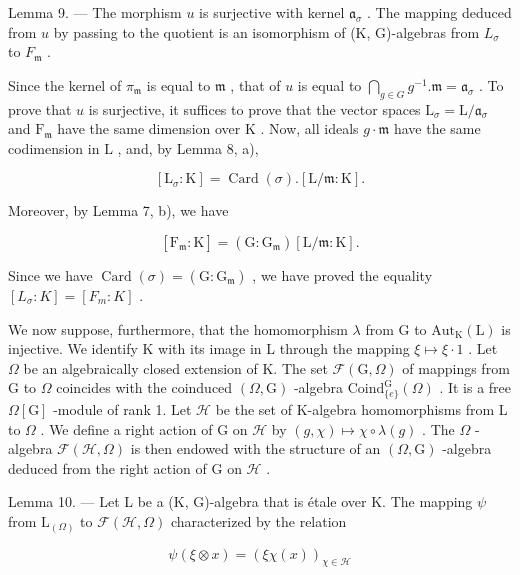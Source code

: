 Lemma 9. --- The morphism \(u\) is surjective with kernel \(\mathfrak{a}_{\sigma}\) . The mapping deduced from \(u\) by passing to the quotient is an isomorphism of (K, G)-algebras from \(L_{\sigma}\) to \(F_{\mathfrak{m}}\) .

Since the kernel of \(\pi_{\mathfrak{m}}\) is equal to \(\mathfrak{m}\) , that of \(u\) is equal to \(\bigcap_{g\in G}g^{-1}.\mathfrak{m} = \mathfrak{a}_{\sigma}\) . To prove that \(u\) is surjective, it suffices to prove that the vector spaces \(\mathrm{L}_{\sigma} = \mathrm{L} / \mathfrak{a}_{\sigma}\) and \(\mathrm{F}_{\mathfrak{m}}\) have the same dimension over \(\mathrm{K}\) . Now, all ideals \(g\cdot \mathfrak{m}\) have the same codimension in \(\mathrm{L}\) , and, by Lemma 8, a),

\[
[ \mathrm{L} _ {\sigma}: \mathrm{K} ] = \operatorname{Card} (\sigma). [ \mathrm{L} / \mathfrak {m}: \mathrm{K} ].
\]

Moreover, by Lemma 7, b), we have

\[
[ \mathrm{F} _ {\mathfrak {m}}: \mathrm{K} ] = (\mathrm{G}: \mathrm{G} _ {\mathfrak {m}}) [ \mathrm{L} / \mathfrak {m}: \mathrm{K} ].
\]

Since we have \(\operatorname{Card}(\sigma)=(\mathrm{G}:\mathrm{G}_{\mathfrak{m}})\) , we have proved the equality \([L_{\sigma}:K]=[F_{m}:K]\) .

We now suppose, furthermore, that the homomorphism \(\lambda\) from G to \(\mathrm{Aut}_{\mathrm{K}}(\mathrm{L})\) is injective. We identify K with its image in L through the mapping \(\xi \mapsto \xi \cdot 1\) . Let \(\Omega\) be an algebraically closed extension of K. The set \(\mathcal{F}(\mathrm{G},\Omega)\) of mappings from G to \(\Omega\) coincides with the coinduced \((\Omega ,\mathrm{G})\) -algebra \(\mathrm{Coind}_{\{e\}}^{\mathrm{G}}(\Omega)\) . It is a free \(\Omega [\mathrm{G}]\) -module of rank 1. Let \(\mathcal{H}\) be the set of K-algebra homomorphisms from L to \(\Omega\) . We define a right action of G on \(\mathcal{H}\) by \((g,\chi)\mapsto \chi \circ \lambda (g)\) . The \(\Omega\) -algebra \(\mathcal{F}(\mathcal{H},\Omega)\) is then endowed with the structure of an \((\Omega ,\mathrm{G})\) -algebra deduced from the right action of G on \(\mathcal{H}\) .

Lemma 10. --- Let L be a (K, G)-algebra that is étale over K. The mapping \(\psi\) from \(\mathrm{L}_{(\Omega)}\) to \(\mathcal{F}(\mathcal{H},\Omega)\) characterized by the relation

\[
\psi (\xi \otimes x) = (\xi \chi (x)) _ {\chi \in \mathscr {H}}
\]

